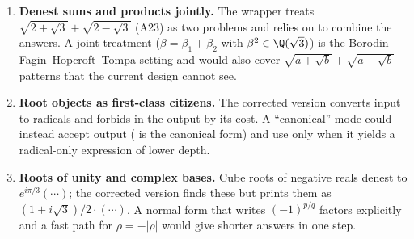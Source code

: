 \begin{enumerate}
      front of the engine.
\item \textbf{Denest sums and products jointly.} The wrapper treats
      $\sqrt{2+\sqrt3}+\sqrt{2-\sqrt3}$ (A23) as two problems and relies on
       to combine the answers. A joint treatment
      ($\beta=\beta_1+\beta_2$ with $\beta^2\in\Q(\sqrt3)$) is the
      Borodin--Fagin--Hopcroft--Tompa setting and would also cover
      $\sqrt{a+\sqrt b}+\sqrt{a-\sqrt b}$ patterns that the current design
      cannot see.
\item \textbf{Root objects as first-class citizens.} The corrected version
      converts  input to radicals and forbids  in the
      output by its cost. A ``canonical'' mode could instead accept
       output ( is the canonical form) and use
       only when it yields a radical-only expression of lower
      depth.
\item \textbf{Roots of unity and complex bases.} Cube roots of negative reals
      denest to $e^{i\pi/3}(\cdots)$; the corrected version finds these but
      prints them as $(1+i\sqrt3)/2\cdot(\cdots)$. A normal form that writes
      $(-1)^{p/q}$ factors explicitly and a fast path for
      $\rho=-|\rho|$ would give shorter answers in one step.
\end{enumerate}

